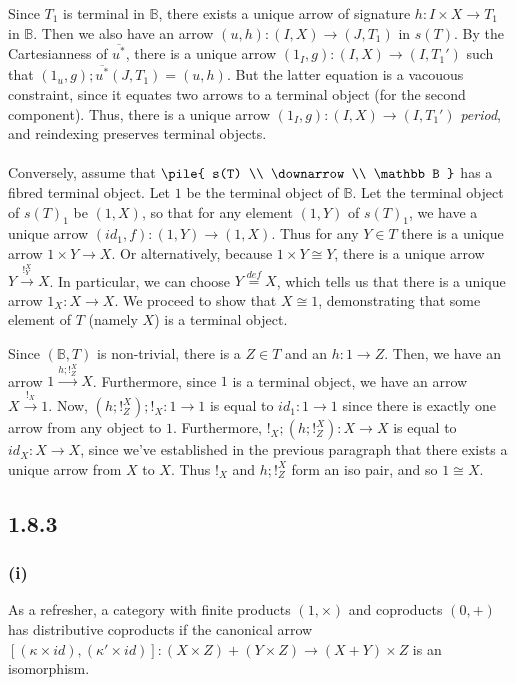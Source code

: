\documentclass{article}
\newcommand{\defeq}{\overset{\mathit{def}}{=}}
\newcommand{\vrt}[2]{
\pile{
#1 \\
\downarrow \\
#2
}
}
\begin{document}
Since $T_1$ is terminal in $\mathbb B$, there exists a unique arrow of signature $h : I \times X \to T_1$ in $\mathbb B$.
Then we also have an arrow $(u,h) : (I, X) \to (J,T_1)$ in $s(T)$. By the Cartesianness of $\overline{u^*}$, there
is a unique arrow $(1_I,g) : (I,X) \to (I,T_1')$ such that $(1_u,g);\overline{u^*}(J,T_1) = (u,h)$. But the latter
equation is a vacouous constraint, since it equates two arrows to a terminal object (for the second component).
Thus, there is a unique arrow $(1_I,g) : (I,X) \to (I,T_1')$ \emph{period}, and reindexing preserves terminal objects.
\\~\\
Conversely, assume that $\vrt{s(T)}{\mathbb B}$ has a fibred terminal object. 
Let $1$ be the terminal object of $\mathbb B$. Let the terminal object of $s(T)_1$ be $(1,X)$, so that 
for any element $(1,Y)$ of $s(T)_1$, we have a unique arrow $(id_1, f) : (1,Y) \to (1,X)$. Thus
for any $Y \in T$ there is a unique arrow $1 \times Y \to X$. Or alternatively, because $1 \times Y \cong Y$,
there is a unique arrow $Y \overset{!^{X}_Y}{\longrightarrow} X$. In particular, we can choose $Y \defeq X$, which tells us that there is a
unique arrow $1_X : X \to X$. We proceed to show that $X \cong 1$, demonstrating that some element of $T$ (namely $X$)
is a terminal object.

Since $(\mathbb B, T)$ is non-trivial, there is a $Z \in T$ and an $h : 1 \to Z$. Then, we have an arrow $1 \overset{h;!_Z^{X}}{\longrightarrow} X$.
Furthermore, since $1$ is a terminal object, we have an arrow $X \overset{!_X}{\longrightarrow} 1$.
Now, $(h;!_Z^X);!_X : 1 \to 1$ is equal to $id_1 : 1 \to 1$ since there is exactly one arrow from any object to $1$.
Furthermore, $!_X;(h;!_Z^X) : X \to X$ is equal to $id_X : X \to X$, since we've established in the previous paragraph
that there exists a unique arrow from $X$ to $X$. Thus $!_X$ and $h;!_Z^X$ form an iso pair, and so $1 \cong X$.

\subsection*{1.8.3}

\subsubsection*{(i)}

As a refresher, a category with finite products $(1,\times)$ and coproducts $(0,+)$ has distributive coproducts
if the canonical arrow $[(\kappa \times id),(\kappa' \times id)] : (X \times Z) + (Y \times Z) \to (X + Y) \times Z$ 
is an isomorphism.\\~\\
\end{document}
